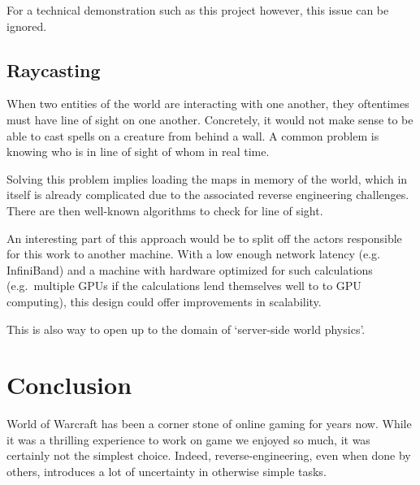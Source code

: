 \documentclass[paper=a4, fontsize=11pt]{scrartcl}
\begin{document}
For a technical demonstration such as this project however, this issue can be
ignored.

\subsection{Raycasting}

When two entities of the world are interacting with one another, they oftentimes 
must have line of sight on one another.
Concretely, it would not make sense to be able to cast spells on a creature from
behind a wall.
A common problem is knowing who is in line of sight of whom in real time.

Solving this problem implies loading the maps in memory of the world, which in
itself is already complicated due to the associated reverse engineering
challenges.
There are then well-known algorithms to check for line of sight.

An interesting part of this approach would be to split off the actors
responsible for this work to another machine. With a low enough network latency
(e.g. InfiniBand) and a machine with hardware optimized for such
calculations (e.g.\ multiple GPUs if the calculations lend themselves well to
to GPU computing), this design could offer improvements in scalability.

This is also way to open up to the domain of `server-side world physics'.

\section{Conclusion}


World of Warcraft has been a corner stone of online gaming for years now.
While it was a thrilling experience to work on game we enjoyed so much, it was
certainly not the simplest choice.
Indeed, reverse-engineering, even when done by others, introduces a lot of
uncertainty in otherwise simple tasks.
\end{document}
